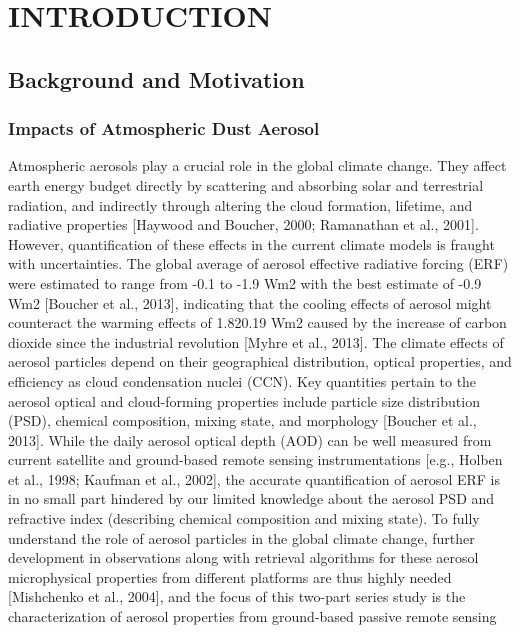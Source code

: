 
\chapter{INTRODUCTION}

\section{Background and Motivation}

\subsection{Impacts of Atmospheric Dust Aerosol}

Atmospheric aerosols play a crucial role in the global 
climate change. They affect earth energy budget directly 
by scattering and absorbing solar and terrestrial radiation, 
and indirectly through altering the cloud formation, 
lifetime, and radiative properties [Haywood and Boucher, 
2000; Ramanathan et al., 2001]. However, quantification of 
these effects in the current climate models is fraught with 
uncertainties. The global average of aerosol effective 
radiative forcing (ERF) were estimated to range from -0.1 
to -1.9 Wm2 with the best estimate of -0.9 Wm2 [Boucher et 
al., 2013], indicating that the cooling effects of aerosol 
might counteract the warming effects of 1.820.19 Wm2 caused
by the increase of carbon dioxide since the industrial 
revolution [Myhre et al., 2013]. The climate effects of 
aerosol particles depend on their geographical distribution, 
optical properties, and efficiency as cloud condensation 
nuclei (CCN). Key quantities pertain to the aerosol optical 
and cloud-forming properties include particle size 
distribution (PSD), chemical composition, mixing state, and 
morphology [Boucher et al., 2013]. While the daily aerosol 
optical depth (AOD) can be well measured from current 
satellite and ground-based remote sensing instrumentations 
[e.g., Holben et al., 1998; Kaufman et al., 2002], the 
accurate quantification of aerosol ERF is in no small part 
hindered by our limited knowledge about the aerosol PSD and 
refractive index (describing chemical composition and 
mixing state). To fully understand the role of aerosol 
particles in the global climate change, further development 
in observations along with retrieval algorithms for these 
aerosol microphysical properties from different platforms 
are thus highly needed [Mishchenko et al., 2004], and 
the focus of this two-part series study is the 
characterization of aerosol properties from ground-based 
passive remote sensing %

